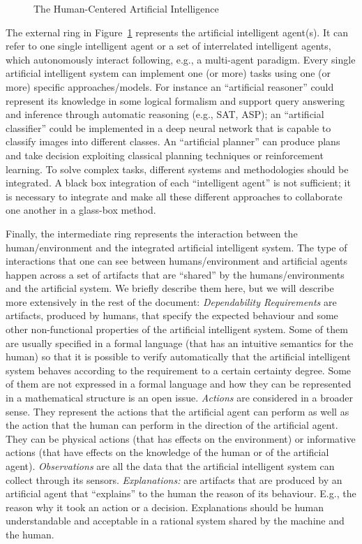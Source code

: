 \begin{figure}[h]
  \begin{center}
    
\end{center}
\caption{\label{fig:hcai-onion} The Human-Centered Artificial
  Intelligence}
\end{figure}

The external ring in Figure~\ref{fig:hcai-onion} represents the
artificial intelligent agent(s). It can refer to one single
intelligent agent or a set of interrelated intelligent agents, which
autonomously interact following, e.g., a multi-agent paradigm. Every
single artificial intelligent system can implement one (or more) tasks
using one (or more) specific approaches/models. For instance an
``artificial reasoner'' could represent its knowledge in some logical
formalism and support query answering and inference through automatic
reasoning (e.g., SAT, ASP); an ``artificial classifier'' could be
implemented in a deep neural network that is capable to classify
images into different classes. An ``artificial planner'' can produce
plans and take decision exploiting classical planning techniques or
reinforcement learning. To solve complex tasks, different systems and
methodologies should be integrated. A black box integration of each
``intelligent agent'' is not sufficient; it is necessary to integrate
and make all these different approaches to collaborate one another in
a glass-box method. 

Finally, the intermediate ring represents the interaction between the
human/environment and the integrated artificial intelligent system.
The type of interactions that one can see between humans/environment and
artificial agents happen across a set of artifacts that are
``shared'' by the humans/environments and the artificial system.
We briefly describe them here, but we will describe more extensively
in the rest of the document:
\emph{Dependability Requirements} are
artifacts, produced by humans, that specify the expected behaviour and
some other non-functional properties of the artificial intelligent
system. Some of them are usually specified in a formal language (that
has an intuitive semantics for the human) so that it is possible to
verify automatically that the artificial intelligent system behaves
according to the requirement to a certain certainty degree.  Some
of them are not expressed in a formal language and how they can be
represented in a mathematical structure is an open issue.
\emph{Actions} are considered in a broader sense. They
  represent the actions that the artificial agent can perform as well
  as the action that the human can perform in the direction of the
  artificial agent. They can be physical actions (that has effects on
  the environment) or informative actions (that have effects on the
  knowledge of the human or of the artificial agent). 
\emph{Observations} are all the data that the artificial
  intelligent system can collect through its sensors.
\emph{Explanations:} are artifacts that are produced by an artificial
  agent that ``explains'' to the human the reason of its
  behaviour. E.g., the reason why it took an action or a
  decision. Explanations should be human understandable and acceptable
  in a rational system shared by the machine and the human. 



